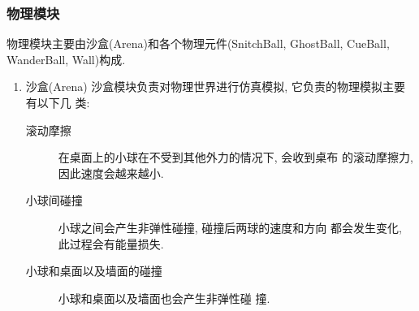 \documentclass[11pt]{article}
\begin{document}
\subsubsection{物理模块}
\label{sec-3-2-1}
物理模块主要由沙盒(Arena)和各个物理元件(SnitchBall, GhostBall,
CueBall, WanderBall, Wall)构成. 
\begin{enumerate}
\item 沙盒(Arena)
\label{sec-3-2-1-1}
沙盒模块负责对物理世界进行仿真模拟, 它负责的物理模拟主要有以下几
类:
\begin{description}
\item[{滚动摩擦}] 在桌面上的小球在不受到其他外力的情况下, 会收到桌布
的滚动摩擦力, 因此速度会越来越小.
\item[{小球间碰撞}] 小球之间会产生非弹性碰撞, 碰撞后两球的速度和方向
都会发生变化, 此过程会有能量损失.
\item[{小球和桌面以及墙面的碰撞}] 小球和桌面以及墙面也会产生非弹性碰
撞.
\end{description}


\end{enumerate}
\end{document}
